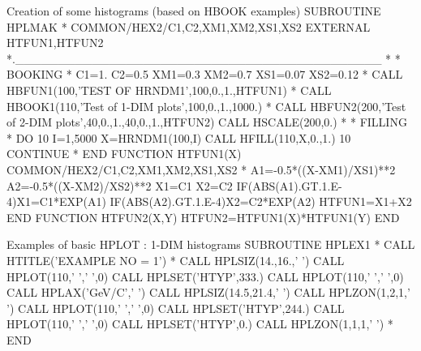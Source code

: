 \newpage

\begin{XMPt}{Creation of some histograms (based on HBOOK examples)}
      SUBROUTINE HPLMAK
*
      COMMON/HEX2/C1,C2,XM1,XM2,XS1,XS2
      EXTERNAL HTFUN1,HTFUN2
*.___________________________________________
*
*             BOOKING
*
      C1=1.
      C2=0.5
      XM1=0.3
      XM2=0.7
      XS1=0.07
      XS2=0.12
*
      CALL HBFUN1(100,'TEST OF HRNDM1',100,0.,1.,HTFUN1)
*
      CALL HBOOK1(110,'Test of 1-DIM plots',100,0.,1.,1000.)
*
      CALL HBFUN2(200,'Test of 2-DIM plots',40,0.,1.,40,0.,1.,HTFUN2)
      CALL HSCALE(200,0.)
*
*             FILLING
*
      DO 10 I=1,5000
         X=HRNDM1(100,I)
         CALL HFILL(110,X,0.,1.)
  10  CONTINUE
*
      END
      FUNCTION HTFUN1(X)
      COMMON/HEX2/C1,C2,XM1,XM2,XS1,XS2
*
      A1=-0.5*((X-XM1)/XS1)**2
      A2=-0.5*((X-XM2)/XS2)**2
      X1=C1
      X2=C2
      IF(ABS(A1).GT.1.E-4)X1=C1*EXP(A1)
      IF(ABS(A2).GT.1.E-4)X2=C2*EXP(A2)
      HTFUN1=X1+X2
      END
      FUNCTION HTFUN2(X,Y)
      HTFUN2=HTFUN1(X)*HTFUN1(Y)
      END
\end{XMPt}

\newpage

\begin{XMPt}{Examples of basic HPLOT : 1-DIM histograms}
      SUBROUTINE HPLEX1
*
      CALL HTITLE('EXAMPLE NO = 1')
*
      CALL HPLSIZ(14.,16.,' ')
      CALL HPLOT(110,' ',' ',0)
      CALL HPLSET('HTYP',333.)
      CALL HPLOT(110,' ',' ',0)
      CALL HPLAX('GeV/C',' ')
      CALL HPLSIZ(14.5,21.4,' ')
      CALL HPLZON(1,2,1,' ')
      CALL HPLOT(110,' ',' ',0)
      CALL HPLSET('HTYP',244.)
      CALL HPLOT(110,' ',' ',0)
      CALL HPLSET('HTYP',0.)
      CALL HPLZON(1,1,1,' ')
*
      END
\end{XMPt}
\newpage
\begin{Fighere}
\begin{center}\mbox{}\end{center}
\end{Fighere}
\begin{Fighere}
\begin{center}\mbox{}\end{center}
\end{Fighere}
\begin{Fighere}
\begin{center}\mbox{}\end{center}
\end{Fighere}


